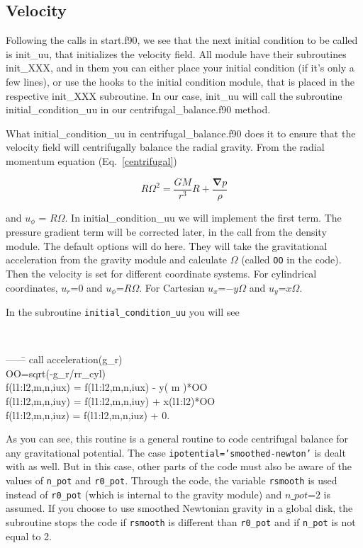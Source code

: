\documentclass[a4paper,10pt]{article}
\renewcommand{\v}[1]{{\boldsymbol #1}} %
\newcommand{\del}{\v{\nabla}}
\newcommand{\grad}{\del}
\begin{document}
\subsection{Velocity}

Following the calls in start.f90, we see that the next initial
condition to be called is init\_uu, that initializes the velocity
field. All module have their subroutines init\_XXX, and in them you
can either place your initial condition (if it's only a few lines), or
use the hooks to the initial condition module, that is placed in the
respective init\_XXX subroutine. In our case, init\_uu will call the
subroutine initial\_condition\_uu in our centrifugal\_balance.f90
method. 

What  initial\_condition\_uu in  centrifugal\_balance.f90 does it to ensure that the velocity field will centrifugally balance the radial gravity. From the radial momentum equation (Eq.~\ref{centrifugal})

\begin{equation}
R\Omega^2 = \frac{GM}{r^3}R + \frac{\grad{p}}{\rho}
\end{equation}

\noindent and $u_\phi$ = $R\Omega$. In initial\_condition\_uu we
will implement the first term. The pressure gradient term will be
corrected later, in the call from the density module. The default
options will do here. They will take the gravitational acceleration from the gravity module and calculate $\Omega$ (called {\tt OO} in the code). Then the velocity is set for different coordinate systems. For cylindrical coordinates, $u_r$=0 and $u_\phi$=$R\Omega$. For Cartesian $u_x$=$-y\Omega$ and $u_y$=$x\Omega$.

In the subroutine {\tt initial\_condition\_uu} you will see

{\tt 
\begin{tabbing}
  ------\=\kill
        \>  call acceleration(g\_r)\\

        \>  OO=sqrt(-g\_r/rr\_cyl)\\
        \>  f(l1:l2,m,n,iux) = f(l1:l2,m,n,iux) - y(  m  )*OO\\
        \>  f(l1:l2,m,n,iuy) = f(l1:l2,m,n,iuy) + x(l1:l2)*OO\\
        \>  f(l1:l2,m,n,iuz) = f(l1:l2,m,n,iuz) + 0.\\
\end{tabbing}
}

As you can see, this routine is a general routine to code centrifugal balance for any gravitational potential. The case {\tt ipotential='smoothed-newton'} is dealt with as well. But in this case, other parts of the code must also be aware of the values of {\tt n\_pot} and {\tt r0\_pot}. Through the code, the variable {\tt rsmooth} is used instead of {\tt r0\_pot} (which is internal to the gravity module) and $n\_pot$=$2$ is assumed. If you choose to use smoothed Newtonian gravity in a global disk, the subroutine stops the code if {\tt rsmooth} is different than {\tt r0\_pot} and if {\tt n\_pot} is not equal to 2. 
\end{document}
